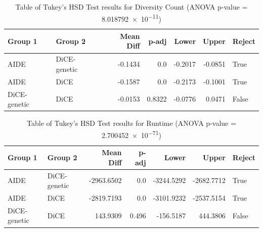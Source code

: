\begin{table}[!htbp]
    \centering
    \begin{tabular}{llrrrrl}
        \toprule
        Group 1 & Group 2 & Mean Diff & p-adj & Lower & Upper & Reject \\
        \midrule
        AIDE          & DiCE-genetic   & -0.1434 & 0.0    & -0.2017 & -0.0851 & True  \\
        AIDE          & DiCE  & -0.1587 & 0.0    & -0.2173 & -0.1001 & True  \\
        DiCE-genetic & DiCE  & -0.0153 & 0.8322 & -0.0776 &  0.0471 & False \\
        \bottomrule
    \end{tabular}
    \caption{Table of Tukey's HSD Test results for Diversity Count (ANOVA p-value = \SI{8.018792e-11}{})}
    \label{tab:tukey_results}
\end{table}
\begin{table}[!htbp]
    \centering
    \begin{tabular}{llrrrrl}
        \toprule
        Group 1 & Group 2 & Mean Diff & p-adj & Lower & Upper & Reject \\
        \midrule
        AIDE          & DiCE-genetic   & -2963.6502 & 0.0   & -3244.5292 & -2682.7712 & True \\
        AIDE          & DiCE  & -2819.7193 & 0.0   & -3101.9232 & -2537.5154 & True \\
        DiCE-genetic & DiCE  &   143.9309 & 0.496 &  -156.5187 &   444.3806 & False \\
        \bottomrule
    \end{tabular}
    \caption{Table of Tukey's HSD Test results for Runtime (ANOVA p-value = \SI{2.700452e-71}{})}
    \label{tab:tukey_results}
\end{table}



